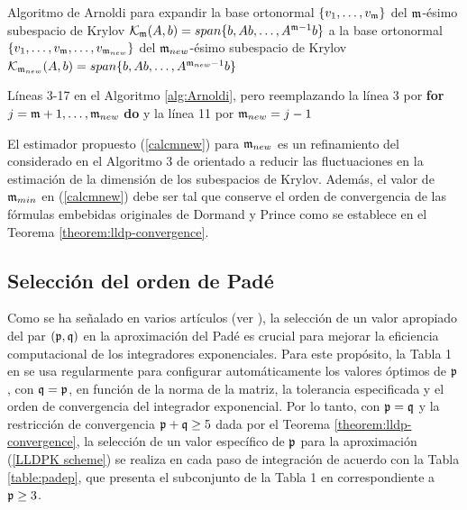 \begin{algorithm}[!htb]
	\caption{Algoritmo de Arnoldi para expandir la base ortonormal $\{v_1,\ldots,v_{\mathfrak{m}} \}$ del $\mathfrak{m}$-ésimo subespacio de Krylov $\mathcal{K}_{\mathfrak{m}}(A,b)=span\{b,Ab,\ldots,A^{\mathfrak{m}-1}b\}$ a la base ortonormal $\{v_1,\ldots,v_{\mathfrak{m}},\ldots,v_{\mathfrak{m}_{new}} \}$ del $\mathfrak{m}_{new}$-ésimo subespacio de Krylov ${\mathcal{K}_{\mathfrak{m}_{new}}(A,b)=span\{b,Ab,\ldots,A^{\mathfrak{m}_{new}-1}b\}}$}
    \label{alg:Arnoldiexpand}
	Líneas 3-17 en el Algoritmo \ref{alg:Arnoldi}, pero reemplazando la línea 3 por \textbf{for} $j=\mathfrak{m}+1,\ldots,\mathfrak{m}_{new}$ \textbf{do} y la línea 11 por $\mathfrak{m}_{new}=j-1$
\end{algorithm}
El estimador propuesto (\ref{calcmnew}) para $\mathfrak{m}_{new}$ es un refinamiento del considerado en el Algoritmo 3 de \cite{niesen2012algorithm} orientado a reducir las fluctuaciones en la estimación de la dimensión de los subespacios de Krylov. Además, el valor de $\mathfrak{m}_{min}$ en (\ref{calcmnew}) debe ser tal que conserve el orden de convergencia de las fórmulas embebidas originales de Dormand y Prince como se establece en el Teorema \ref{theorem:lldp-convergence}.

\subsection{Selección del orden de Padé}\label{sec:pade-order}
Como se ha señalado en varios artículos (ver \cite{jimenez2009rate,jimenez2012convergence, Jimenez14AMC, jimenez2015convergence}), la selección de un valor apropiado del par $(\mathfrak{p},\mathfrak{q})$ en la aproximación del Padé es crucial para mejorar la eficiencia computacional de los integradores exponenciales. Para este propósito, la Tabla 1 en \cite{moler2003nineteen} se usa regularmente para configurar automáticamente los valores óptimos de $\mathfrak{p}$, con $\mathfrak{q}=\mathfrak{p}$, en función de la norma de la matriz, la tolerancia especificada y el orden de convergencia del integrador exponencial. Por lo tanto, con $\mathfrak{p}=\mathfrak{q}$ y la restricción de convergencia $\mathfrak{p}+\mathfrak{q}\geq5$ dada por el Teorema \ref{theorem:lldp-convergence}, la selección de un valor específico de $\mathfrak{p}$ para la aproximación (\ref{LLDPK scheme}) se realiza en cada paso de integración de acuerdo con la Tabla \ref{table:padep}, que presenta el subconjunto de la Tabla 1 en \cite{moler2003nineteen} correspondiente a $\mathfrak{p} \ge 3$.

